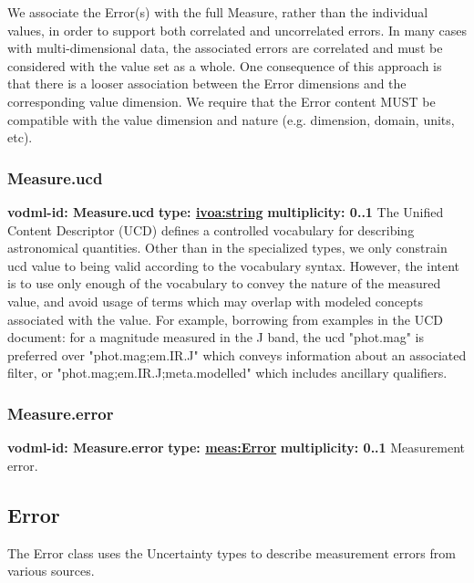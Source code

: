     We associate the Error(s) with the full Measure, rather than the individual values, in order to support both correlated and uncorrelated errors. In many cases with multi-dimensional data, the associated errors are correlated and must be considered with the value set as a whole. One consequence of this approach is that there is a looser association between the Error dimensions and the corresponding value dimension. We require that the Error content MUST be compatible with the value dimension and nature (e.g. dimension, domain, units, etc).

    \subsubsection{Measure.ucd}
      \textbf{vodml-id: Measure.ucd} \newline
      \textbf{type: \hyperref[sect:ivoa]{ivoa:string}} \newline
      \textbf{multiplicity: 0..1} \newline 
      The Unified Content Descriptor (UCD) defines a controlled vocabulary for describing astronomical quantities. Other than in the specialized types, we only constrain ucd value to being valid according to the vocabulary syntax. However, the intent is to use only enough of the vocabulary to convey the nature of the measured value, and avoid usage of terms which may overlap with modeled concepts associated with the value. For example, borrowing from examples in the UCD document: for a magnitude measured in the J band, the ucd "phot.mag" is preferred over "phot.mag;em.IR.J" which conveys information about an associated filter, or "phot.mag;em.IR.J;meta.modelled" which includes ancillary qualifiers.

    \subsubsection{Measure.error}
      \textbf{vodml-id: Measure.error} \newline
      \textbf{type: \hyperref[sect:Error]{meas:Error}} \newline
      \textbf{multiplicity: 0..1} \newline 
      Measurement error.

  \subsection{Error}
  \label{sect:Error}
    The Error class uses the Uncertainty types to describe measurement errors from various sources.

